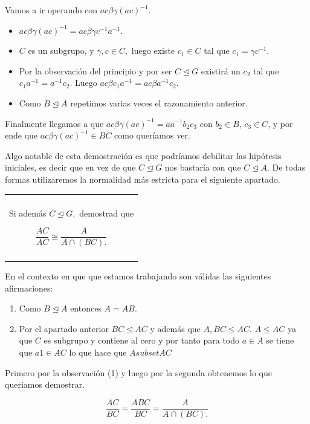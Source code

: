\documentclass[12pt]{article}
\newenvironment{micaja}
{
    \begin{center}
    \begin{tabular}{|p{0.9\textwidth}|}
    \hline\\
    }   
    {   
    \\\\\hline
    \end{tabular} 
    \end{center}
    }
\begin{document}
Vamos a ir operando con $ac \beta \gamma (ac)^{-1}$.
\begin{itemize}
    \item $ac \beta \gamma (ac)^{-1} = ac \beta \gamma c^{-1} a^{-1}.$
    \item $C$ es un subgrupo, y $\gamma , c \in C,$ luego existe $c_1 \in C$ tal que $c_1 = \gamma c^{-1}.$
    \item Por la observación del principio y por ser $C \trianglelefteq G$ existirá un $c_2$ tal que $c_1 a^{-1} = a^{-1}c_2.$
    Luego $ac \beta c_1 a^{-1} = ac \beta a^{-1} c_2.$
    \item Como $B \trianglelefteq A$ repetimos varias veces el razonamiento anterior. 
\end{itemize}

Finalmente llegamos a que $ac \beta \gamma (ac)^{-1} = a a^{-1} b_2 c_3$ con $b_2 \in B$, $c_3  \in C$, 
y por ende que $ac \beta \gamma (ac)^{-1} \in BC$ como queríamos ver. 

Algo notable de esta demostración es que podríamos debilitar las hipótesis iniciales, es decir
que en vez de que $C \trianglelefteq G$ nos bastaría con que $C \trianglelefteq A.$ De todas formas
utilizaremos la normalidad más estricta para el siguiente apartado. 

\begin{micaja}
    Si además $C \trianglelefteq G,$ demostrad que  

    \begin{equation*}
        \frac{AC}{AC} \cong \frac{A}{A \cap (BC).}
    \end{equation*}
\end{micaja}
    
En el contexto en que que estamos trabajando son válidas las siguientes afirmaciones: 

\begin{enumerate}
    \item Como $B \trianglelefteq A$ entonces $A = AB.$
    \item Por el apartado anterior $BC \trianglelefteq AC$ y además que $A, BC \leq AC.$
    $A \leq AC$ ya que $C$ es subgrupo y contiene al cero y por tanto para todo $a \in A$ se tiene que
     $a1 \in AC$ lo que hace que $A subset AC$
\end{enumerate}

Primero por la observación (1) y luego por la segunda obtenemos lo que queriamos demostrar.

\begin{equation*}
    \frac{AC}{BC} = \frac{ABC}{BC} = \frac{A}{A\cap (BC).}
\end{equation*}
\end{document}

